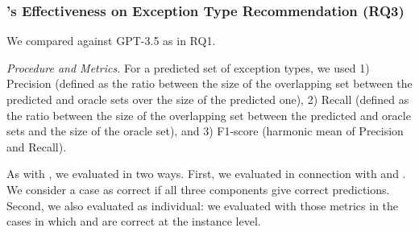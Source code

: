 \vspace{-6pt}
\subsubsection{{\xtype}'s Effectiveness on Exception Type Recommendation (RQ3)}

 We compared {\xtype} against GPT-3.5 as in RQ1.






{\em Procedure and Metrics.} For a predicted set of exception types,
we used 1) Precision (defined as the ratio between the size of the
overlapping set between the predicted and oracle sets over the size of
the predicted one), 2) Recall (defined as the ratio between the size
of the overlapping set between the predicted and oracle sets and the
size of the oracle set), and 3) F1-score (harmonic mean of Precision
and Recall).

As with {\xstate}, we evaluated {\xtype} in two ways. First, we
evaluated {\xtype} in connection with {\xblock} and {\xstate}. We
consider a case as correct if all three components give correct
predictions.
Second, we also evaluated {\xtype} as individual: we evaluated
{\xtype} with those metrics in the cases in which {\xblock} and
{\xstate} are correct at the instance level.


